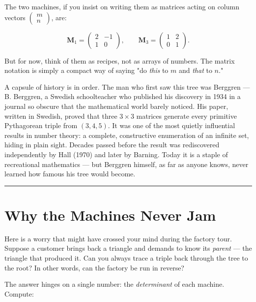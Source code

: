 \documentclass[11pt,openany]{book}
\theoremstyle{definition}
\theoremstyle{plain}
\theoremstyle{remark}
\begin{document}
The two machines, if you insist on writing them as matrices acting on column vectors $\begin{pmatrix} m \\ n \end{pmatrix}$, are:

\[
\mathbf{M}_1 = \begin{pmatrix} 2 & -1 \\ 1 & 0 \end{pmatrix}, \qquad
\mathbf{M}_3 = \begin{pmatrix} 1 & 2 \\ 0 & 1 \end{pmatrix}.
\]


But for now, think of them as recipes, not as arrays of numbers. The matrix notation is simply a compact way of saying "do \textit{this} to $m$ and \textit{that} to $n$."

A capsule of history is in order. The man who first saw this tree was Berggren — B. Berggren, a Swedish schoolteacher who published his discovery in 1934 in a journal so obscure that the mathematical world barely noticed. His paper, written in Swedish, proved that three $3 \times 3$ matrices generate every primitive Pythagorean triple from $(3, 4, 5)$. It was one of the most quietly influential results in number theory: a complete, constructive enumeration of an infinite set, hiding in plain sight. Decades passed before the result was rediscovered independently by Hall (1970) and later by Barning. Today it is a staple of recreational mathematics — but Berggren himself, as far as anyone knows, never learned how famous his tree would become.

\bigskip\noindent\rule{\textwidth}{0.4pt}\bigskip


\section*{Why the Machines Never Jam}


Here is a worry that might have crossed your mind during the factory tour. Suppose a customer brings back a triangle and demands to know its \textit{parent} — the triangle that produced it. Can you always trace a triple back through the tree to the root? In other words, can the factory be run in reverse?

The answer hinges on a single number: the \textit{determinant} of each machine. Compute:
\end{document}
